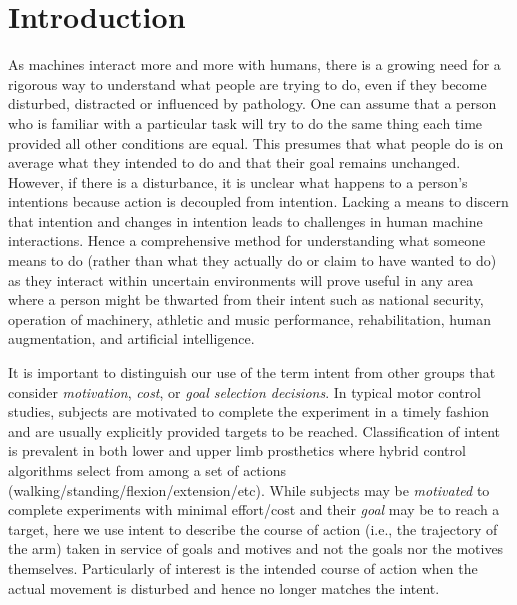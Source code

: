 \documentclass[10pt]{article}
\begin{document}
\section*{Introduction}
As machines interact more and more with humans, there is a growing need for a rigorous way to understand what people are trying to do, even if they become disturbed, distracted or influenced by pathology. One can assume that a person who is familiar with a particular task will try to do the same thing each time provided all other conditions are equal. This presumes that what people do is on average what they intended to do and that their goal remains unchanged. However, if there is a disturbance, it is unclear what happens to a person's intentions because action is decoupled from intention. Lacking a means to discern that intention and changes in intention leads to challenges in human machine interactions. Hence a comprehensive method for understanding what someone means to do (rather than what they actually do or claim to have wanted to do) as they interact within uncertain environments will prove useful in any area where a person might be thwarted from their intent such as national security, operation of machinery, athletic and music performance, rehabilitation, human augmentation, and artificial intelligence.

It is important to distinguish our use of the term intent from other groups that consider \textit{motivation}\cite{mcclelland1985motives, rawolle2013relationships}, \textit{cost}\cite{todorov2002optimal, flash1985coordination}, or \textit{goal selection decisions}\cite{ziebart2010modeling}. In typical motor control studies, subjects are motivated to complete the experiment in a timely fashion and are usually explicitly provided targets to be reached. Classification of intent is prevalent in both lower \cite{strausser2011development, hargrove2013robotic} and upper limb\cite{englehart2003robust, young2012improving} prosthetics where hybrid control algorithms select from among a set of actions (walking/standing/flexion/extension/etc). While subjects may be \textit{motivated} to complete experiments with minimal effort/cost and their \textit{goal} may be to reach a target, here we use intent to describe the course of action (i.e., the trajectory of the arm) taken in service of goals and motives and not the goals nor the motives themselves. Particularly of interest is the intended course of action when the actual movement is disturbed and hence no longer matches the intent.
\end{document}
